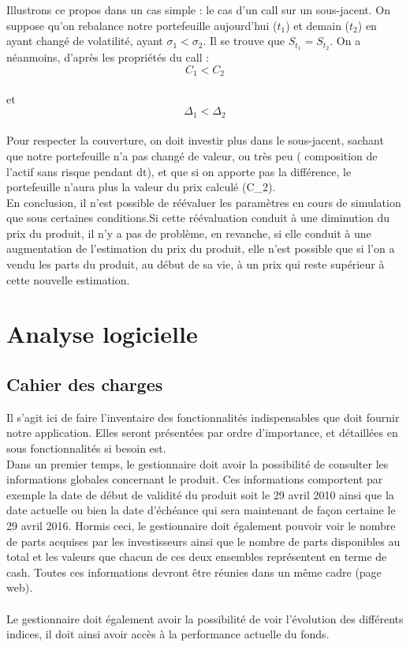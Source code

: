 \documentclass[french,12pt,a4paper]{article}
\begin{document}
Illustrons ce propos dans un cas simple : le cas d'un call sur un sous-jacent. On suppose qu'on rebalance notre portefeuille aujourd'hui ($t_{1}$) et demain ($t_{2}$) en ayant changé de volatilité, ayant $\sigma_{1}<\sigma_{2}$. Il se trouve que $S_{t_{1}}=S_{t_{2}}$. On a néanmoins, d'après les propriétés du call : \\
$$C_{1}<C_{2}$$\\ et $$\Delta_{1}<\Delta_{2}$$ \\
Pour respecter la couverture, on doit investir plus dans le sous-jacent, sachant que notre portefeuille n'a pas changé de valeur, ou très peu ( composition de l'actif sans risque pendant dt), et que si on apporte pas la différence, le portefeuille n'aura plus la valeur du prix calculé (C_{2}).\\

En conclusion, il n'est possible de réévaluer les paramètres en cours de simulation que sous certaines conditions.Si cette réévaluation conduit à une diminution du prix du produit, il n'y a pas de problème, en revanche, si elle conduit à une augmentation de l'estimation du prix du produit, elle n'est possible que si l'on a vendu les parts du produit, au début de sa vie, à un prix qui reste supérieur à cette nouvelle estimation.



\section{Analyse logicielle}

\subsection{Cahier des charges}
Il s'agit ici de faire l'inventaire des fonctionnalités indispensables que doit fournir notre application. Elles seront présentées par ordre d'importance, et détaillées en sous fonctionnalités si besoin est.
\\
\indent Dans un premier temps, le gestionnaire doit avoir la possibilité de consulter les informations globales concernant le produit. Ces informations comportent par exemple la date de début de validité du produit soit le 29 avril  2010 ainsi que la date actuelle ou bien la date d'échéance qui sera maintenant de façon certaine le 29 avril 2016. Hormis ceci, le gestionnaire doit également pouvoir voir le nombre de parts acquises par les investisseurs ainsi que le nombre de parts disponibles au total et les valeurs que chacun de ces deux ensembles représentent en terme de cash. Toutes ces informations devront être réunies dans un même cadre (page web).\\
\indent \\
\indent Le gestionnaire doit également avoir la possibilité de voir l'évolution des différents indices, il doit ainsi avoir accès à la performance actuelle du fonds.
\end{document}
